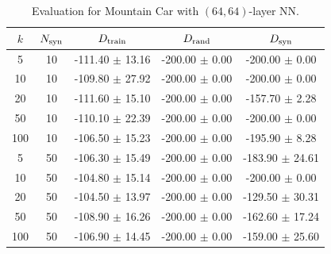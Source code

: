 \begin{table}[h!]
\centering
\caption{Evaluation for Mountain Car with $(64,64)$-layer NN.}
\begin{tabular}{ccccc}
\hline
$k$ & $N_{\textnormal{syn}}$ & $D_{\textnormal{train}}$ & $D_{\textnormal{rand}}$ & $D_{\textnormal{syn}}$ \\ \hline
5 & 10 & -111.40 $\pm$ 13.16 & -200.00 $\pm$ 0.00 & -200.00 $\pm$ 0.00 \\ 
10 & 10 & -109.80 $\pm$ 27.92 & -200.00 $\pm$ 0.00 & -200.00 $\pm$ 0.00 \\ 
20 & 10 & -111.60 $\pm$ 15.10 & -200.00 $\pm$ 0.00 & -157.70 $\pm$ 2.28 \\ 
50 & 10 & -110.10 $\pm$ 22.39 & -200.00 $\pm$ 0.00 & -200.00 $\pm$ 0.00 \\ 
100 & 10 & -106.50 $\pm$ 15.23 & -200.00 $\pm$ 0.00 & -195.90 $\pm$ 8.28 \\ \hline
5 & 50 & -106.30 $\pm$ 15.49 & -200.00 $\pm$ 0.00 & -183.90 $\pm$ 24.61 \\ 
10 & 50 & -104.80 $\pm$ 15.14 & -200.00 $\pm$ 0.00 & -200.00 $\pm$ 0.00 \\ 
20 & 50 & -104.50 $\pm$ 13.97 & -200.00 $\pm$ 0.00 & -129.50 $\pm$ 30.31 \\ 
50 & 50 & -108.90 $\pm$ 16.26 & -200.00 $\pm$ 0.00 & -162.60 $\pm$ 17.24 \\ 
100 & 50 & -106.90 $\pm$ 14.45 & -200.00 $\pm$ 0.00 & -159.00 $\pm$ 25.60 \\ \hline

\end{tabular}
\end{table}
